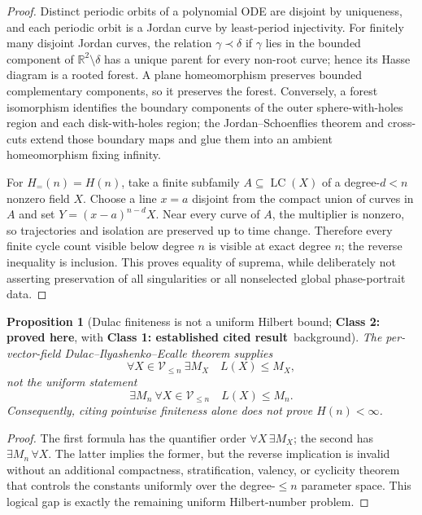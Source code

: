 \documentclass[11pt]{article}
\newtheorem{proposition}{Proposition}
\newcommand{\R}{\mathbb R}
\newcommand{\classone}{\textbf{Class 1: established cited result}}
\newcommand{\classtwo}{\textbf{Class 2: proved here}}
\begin{document}
\begin{proof}
Distinct periodic orbits of a polynomial ODE are disjoint by uniqueness, and each periodic orbit is a Jordan curve by least-period injectivity.  For finitely many disjoint Jordan curves, the relation \(\gamma\prec\delta\) if \(\gamma\) lies in the bounded component of \(\R^2\setminus\delta\) has a unique parent for every non-root curve; hence its Hasse diagram is a rooted forest.  A plane homeomorphism preserves bounded complementary components, so it preserves the forest.  Conversely, a forest isomorphism identifies the boundary components of the outer sphere-with-holes region and each disk-with-holes region; the Jordan--Schoenflies theorem and cross-cuts extend those boundary maps and glue them into an ambient homeomorphism fixing infinity.

For \(H_{=}(n)=H(n)\), take a finite subfamily \(A\subseteq\operatorname{LC}(X)\) of a degree-\(d<n\) nonzero field \(X\).  Choose a line \(x=a\) disjoint from the compact union of curves in \(A\) and set \(Y=(x-a)^{n-d}X\).  Near every curve of \(A\), the multiplier is nonzero, so trajectories and isolation are preserved up to time change.  Therefore every finite cycle count visible below degree \(n\) is visible at exact degree \(n\); the reverse inequality is inclusion.  This proves equality of suprema, while deliberately not asserting preservation of all singularities or all nonselected global phase-portrait data.
\end{proof}

\begin{proposition}[Dulac finiteness is not a uniform Hilbert bound; \classtwo, with \classone\ background]\label{prop:dulac-uniform}
The per-vector-field Dulac--Ilyashenko--Ecalle theorem supplies
\[
  \forall X\in\mathcal V_{\le n}\ \exists M_X\quad L(X)\le M_X,
\]
not the uniform statement
\[
  \exists M_n\ \forall X\in\mathcal V_{\le n}\quad L(X)\le M_n.
\]
Consequently, citing pointwise finiteness alone does not prove \(H(n)<\infty\).
\end{proposition}

\begin{proof}
The first formula has the quantifier order \(\forall X\,\exists M_X\); the second has \(\exists M_n\,\forall X\).  The latter implies the former, but the reverse implication is invalid without an additional compactness, stratification, valency, or cyclicity theorem that controls the constants uniformly over the degree-\(\le n\) parameter space.  This logical gap is exactly the remaining uniform Hilbert-number problem.
\end{proof}
\end{document}
